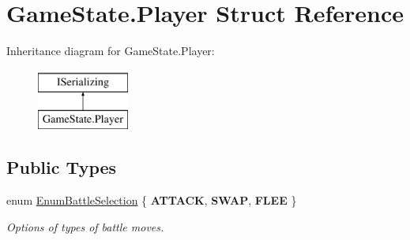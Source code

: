 \hypertarget{struct_game_state_1_1_player}{\section{Game\-State.\-Player Struct Reference}
\label{struct_game_state_1_1_player}
}
Inheritance diagram for Game\-State.\-Player\-:\begin{figure}[H]
\begin{center}
\leavevmode
\includegraphics[height=2.000000cm]{struct_game_state_1_1_player}
\end{center}
\end{figure}
\subsection*{Public Types}
\begin{DoxyCompactItemize}
\item 
enum \hyperlink{struct_game_state_1_1_player_a9f54c5eca1e60acbaa2074e981f51615}{Enum\-Battle\-Selection} \{ {\bfseries A\-T\-T\-A\-C\-K}, 
{\bfseries S\-W\-A\-P}, 
{\bfseries F\-L\-E\-E}
 \}
\begin{DoxyCompactList}\small\item\em Options of types of battle moves. \end{DoxyCompactList}\end{DoxyCompactItemize}
